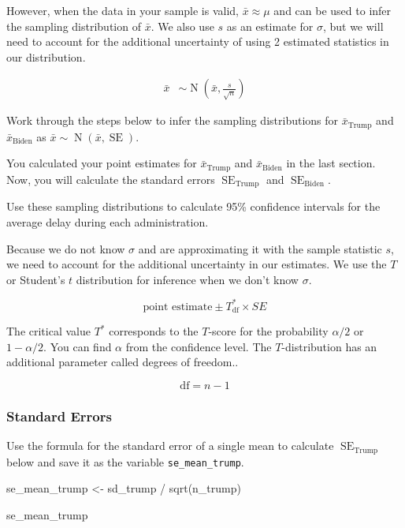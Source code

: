 \documentclass[
  letterpaper,
  DIV=11,
  numbers=noendperiod]{scrartcl}
\newenvironment{Shaded}{\begin{snugshade}}{\end{snugshade}}
\newcommand{\FunctionTok}[1]{\textcolor[rgb]{0.28,0.35,0.67}{#1}}
\newcommand{\NormalTok}[1]{\textcolor[rgb]{0.00,0.23,0.31}{#1}}
\newcommand{\OtherTok}[1]{\textcolor[rgb]{0.00,0.23,0.31}{#1}}
\newcommand{\SpecialCharTok}[1]{\textcolor[rgb]{0.37,0.37,0.37}{#1}}
\begin{document}
However, when the data in your sample is valid, \(\bar{x} \approx \mu\)
and can be used to infer the sampling distribution of \(\bar{x}\). We
also use \(s\) as an estimate for \(\sigma\), but we will need to
account for the additional uncertainty of using 2 estimated statistics
in our distribution.

\[
\begin{aligned}
\bar{x} &\sim \operatorname{N}\left(\bar{x}, \frac{s}{\sqrt{n}}\right)
\end{aligned}
\]

Work through the steps below to infer the sampling distributions for
\(\bar{x}_{\text{Trump}}\) and \(\bar{x}_{\text{Biden}}\) as
\(\bar{x} \sim \operatorname{N}\left(\bar{x}, \operatorname{SE}\right)\).

You calculated your point estimates for \(\bar{x}_{\text{Trump}}\) and
\(\bar{x}_{\text{Biden}}\) in the last section. Now, you will calculate
the standard errors \(\operatorname{SE}_{\text{Trump}}\) and
\(\operatorname{SE}_{\text{Biden}}\).

Use these sampling distributions to calculate 95\% confidence intervals
for the average delay during each administration.

Because we do not know \(\sigma\) and are approximating it with the
sample statistic \(s\), we need to account for the additional
uncertainty in our estimates. We use the \(T\) or Student's \(t\)
distribution for inference when we don't know \(\sigma\).

\[
\text{point estimate} \pm T^*_{\text{df}} \times SE
\]

The critical value \(T^*\) corresponds to the \(T\)-score for the
probability \(\alpha/2\) or \(1-\alpha/2\). You can find \(\alpha\) from
the confidence level. The \(T\)-distribution has an additional parameter
called degrees of freedom..

\[
\text{df}=n-1
\]

\subsubsection{Standard Errors}\label{standard-errors-1}

Use the formula for the standard error of a single mean to calculate
\(\operatorname{SE}_{\text{Trump}}\) below and save it as the variable
\texttt{se\_mean\_trump}.

\begin{Shaded}
\begin{Highlighting}[]
\NormalTok{se\_mean\_trump }\OtherTok{\textless{}{-}}\NormalTok{ sd\_trump }\SpecialCharTok{/} \FunctionTok{sqrt}\NormalTok{(n\_trump)}

\NormalTok{se\_mean\_trump}
\end{Highlighting}
\end{Shaded}
\end{document}
